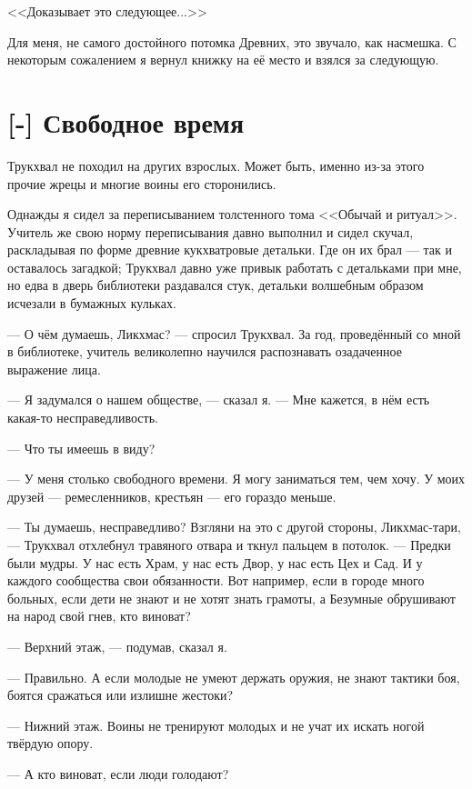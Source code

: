 <<Доказывает это следующее...>>

Для меня, не самого достойного потомка Древних, это звучало, как насмешка.
С некоторым сожалением я вернул книжку на её место и взялся за следующую.

\section{[-] Свободное время}

\textspace

Трукхвал не походил на других взрослых.
Может быть, именно из-за этого прочие жрецы и многие воины его сторонились.

Однажды я сидел за переписыванием толстенного тома <<Обычай и ритуал>>.
Учитель же свою норму переписывания давно выполнил и сидел скучал, раскладывая по форме древние кукхватровые детальки.
Где он их брал --- так и оставалось загадкой;
Трукхвал давно уже привык работать с детальками при мне, но едва в дверь библиотеки раздавался стук, детальки волшебным образом исчезали в бумажных кульках.

--- О чём думаешь, Ликхмас? --- спросил Трукхвал.
За год, проведённый со мной в библиотеке, учитель великолепно научился распознавать озадаченное выражение лица.

--- Я задумался о нашем обществе, --- сказал я.
--- Мне кажется, в нём есть какая-то несправедливость.

--- Что ты имеешь в виду?

--- У меня столько свободного времени.
Я могу заниматься тем, чем хочу.
У моих друзей --- ремесленников, крестьян --- его гораздо меньше.

--- Ты думаешь, несправедливо?
Взгляни на это с другой стороны, Ликхмас-тари, --- Трукхвал отхлебнул травяного отвара и ткнул пальцем в потолок.
--- Предки были мудры.
У нас есть Храм, у нас есть Двор, у нас есть Цех и Сад.
И у каждого сообщества свои обязанности.
Вот например, если в городе много больных, если дети не знают и не хотят знать грамоты, а Безумные обрушивают на народ свой гнев, кто виноват?

--- Верхний этаж, --- подумав, сказал я.

--- Правильно.
А если молодые не умеют держать оружия, не знают тактики боя, боятся сражаться или излишне жестоки?

--- Нижний этаж.
Воины не тренируют молодых и не учат их искать ногой твёрдую опору.

--- А кто виноват, если люди голодают?

